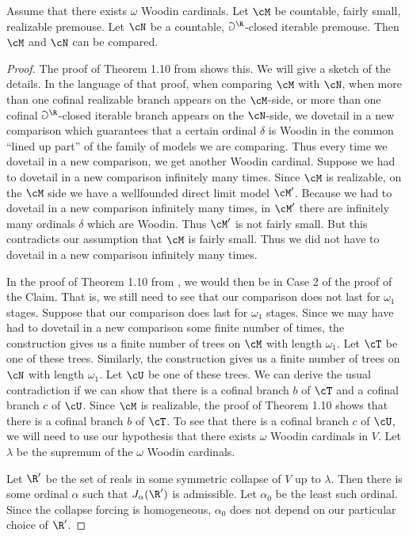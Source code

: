 \begin{lemma}
\label{ComparisonLemma}
Assume that there exists $\omega$ Woodin cardinals.
Let $\cM$ be countable, fairly small, realizable premouse. Let $\cN$ be a
countable, $\Game^{\R}$-closed iterable premouse.
Then $\cM$ and $\cN$ can be compared.
\end{lemma}
\begin{proof}
The proof of Theorem 1.10 from \cite{Many_Woodins} shows this.
We will give a sketch of the details.
In the language of that proof, when comparing $\cM$ with $\cN$,
when more than one cofinal realizable branch appears on the $\cM$-side,
or more than one cofinal $\Game^{\R}$-closed iterable branch appears
on the $\cN$-side, we dovetail in a new comparison which guarantees that a
certain ordinal $\delta$ is Woodin in the common ``lined up part'' of
the family of models we are comparing. Thus every time we dovetail
in a new comparison, we get another Woodin cardinal. Suppose we
had to dovetail in a new comparison infinitely many times. Since
$\cM$ is realizable, on the $\cM$ side we have a wellfounded direct
limit model $\cM^{\prime}$. Because we had to dovetail in a new
comparison infinitely many times, in $\cM^{\prime}$ there are
infinitely many ordinals $\delta$ which are Woodin. Thus $\cM^{\prime}$
is not fairly small. But this contradicts our assumption that
$\cM$ is fairly small. Thus we did not have to dovetail in a new
comparison infinitely many times.

In the proof of Theorem 1.10 from \cite{Many_Woodins}, we would
then be in Case 2 of the proof of the Claim. That is, we still need
to see that our comparison does not last for $\omega_1$ stages.
Suppose that our comparison does last for $\omega_1$ stages.
Since we may have had to dovetail in a new comparison some finite number of
times, the construction gives us a finite number of trees on $\cM$ with
length $\omega_1$. Let $\cT$ be one of these trees. Similarly, the
construction gives us a finite number of trees on $\cN$ with length
$\omega_1$. Let $\cU$ be one of these trees.
We can derive the usual
 contradiction if
we can show that there is a cofinal branch $b$ of $\cT$ and a cofinal
branch $c$ of $\cU$. Since $\cM$ is realizable, the proof of
Theorem 1.10 shows that there is a cofinal branch $b$ of $\cT$.
To see that there is a cofinal branch $c$ of $\cU$, we will need
to use our hypothesis that there exists $\omega$ Woodin cardinals
in $V$. Let $\lambda$ be the supremum of the $\omega$ Woodin cardinals.

Let $\R^{\prime}$ be the set of reals in some symmetric collapse of $V$
up to $\lambda$. Then there is some ordinal $\alpha$ such that
$J_{\alpha}(\R^{\prime})$ is admissible. Let $\alpha_0$ be the least
such ordinal. Since the collapse forcing is homogeneous, $\alpha_0$
does not depend on our particular choice of $\R^{\prime}$.


\end{proof}
